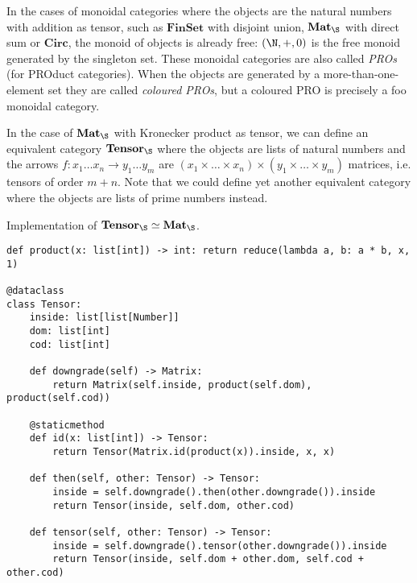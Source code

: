 \begin{example}
In the cases of monoidal categories where the objects are the natural numbers with addition as tensor, such as $\mathbf{FinSet}$ with disjoint union, $\mathbf{Mat}_\S$ with direct sum or $\mathbf{Circ}$, the monoid of objects is already free: $(\N, +, 0)$ is the free monoid generated by the singleton set.
These monoidal categories are also called \emph{PROs} (for PROduct categories).
When the objects are generated by a more-than-one-element set they are called \emph{coloured PROs}, but a coloured PRO is precisely a foo monoidal category.
\end{example}

\begin{example}
In the case of $\mathbf{Mat}_\S$ with Kronecker product as tensor, we can define an equivalent category $\mathbf{Tensor}_\S$ where the objects are lists of natural numbers and the arrows $f : x_1 \dots x_n \to y_1 \dots y_m$ are $(x_1 \times \dots \times x_n) \times (y_1 \times \dots \times y_m)$ matrices, i.e. tensors of order $m + n$.
Note that we could define yet another equivalent category where the objects are lists of prime numbers instead.
\end{example}

\begin{python}
{\normalfont Implementation of $\mathbf{Tensor}_\S \simeq \mathbf{Mat}_\S$.}

\begin{verbatim}
def product(x: list[int]) -> int: return reduce(lambda a, b: a * b, x, 1)

@dataclass
class Tensor:
    inside: list[list[Number]]
    dom: list[int]
    cod: list[int]

    def downgrade(self) -> Matrix:
        return Matrix(self.inside, product(self.dom), product(self.cod))

    @staticmethod
    def id(x: list[int]) -> Tensor:
        return Tensor(Matrix.id(product(x)).inside, x, x)

    def then(self, other: Tensor) -> Tensor:
        inside = self.downgrade().then(other.downgrade()).inside
        return Tensor(inside, self.dom, other.cod)

    def tensor(self, other: Tensor) -> Tensor:
        inside = self.downgrade().tensor(other.downgrade()).inside
        return Tensor(inside, self.dom + other.dom, self.cod + other.cod)
\end{verbatim}
\end{python}

